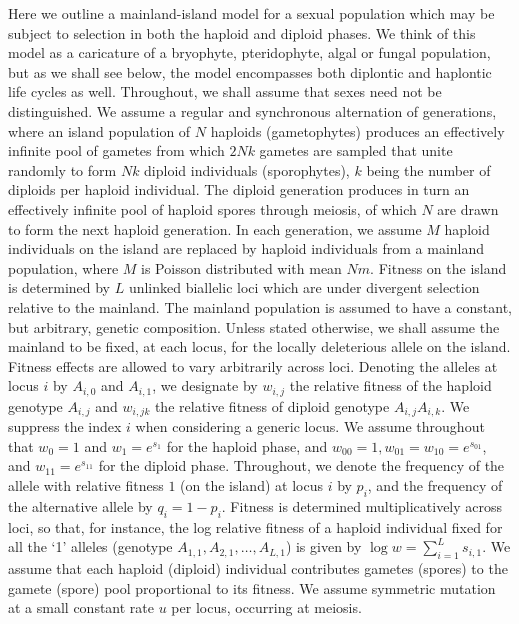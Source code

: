 \documentclass[
  11pt,
]{article}
\begin{document}
Here we outline a mainland-island model for a sexual population which
may be subject to selection in both the haploid and diploid phases. We
think of this model as a caricature of a bryophyte, pteridophyte, algal
or fungal population, but as we shall see below, the model encompasses
both diplontic and haplontic life cycles as well. Throughout, we shall
assume that sexes need not be distinguished. We assume a regular and
synchronous alternation of generations, where an island population of
\(N\) haploids (gametophytes) produces an effectively infinite pool of
gametes from which \(2Nk\) gametes are sampled that unite randomly to
form \(N k\) diploid individuals (sporophytes), \(k\) being the number
of diploids per haploid individual. The diploid generation produces in
turn an effectively infinite pool of haploid spores through meiosis, of
which \(N\) are drawn to form the next haploid generation. In each
generation, we assume \(M\) haploid individuals on the island are
replaced by haploid individuals from a mainland population, where \(M\)
is Poisson distributed with mean \(Nm\). Fitness on the island is
determined by \(L\) unlinked biallelic loci which are under divergent
selection relative to the mainland. The mainland population is assumed
to have a constant, but arbitrary, genetic composition. Unless stated
otherwise, we shall assume the mainland to be fixed, at each locus, for
the locally deleterious allele on the island. Fitness effects are
allowed to vary arbitrarily across loci. Denoting the alleles at locus
\(i\) by \(A_{i,0}\) and \(A_{i,1}\), we designate by \(w_{i,j}\) the
relative fitness of the haploid genotype \(A_{i,j}\) and \(w_{i,jk}\)
the relative fitness of diploid genotype \(A_{i,j}A_{i,k}\). We suppress
the index \(i\) when considering a generic locus. We assume throughout
that \(w_0 = 1\) and \(w_1 = e^{s_1}\) for the haploid phase, and
\(w_{00} = 1, w_{01} = w_{10} = e^{s_{01}}\), and
\(w_{11} = e^{s_{11}}\) for the diploid phase. Throughout, we denote the
frequency of the allele with relative fitness \(1\) (on the island) at
locus \(i\) by \(p_i\), and the frequency of the alternative allele by
\(q_i = 1-p_i\). Fitness is determined multiplicatively across loci, so
that, for instance, the log relative fitness of a haploid individual
fixed for all the `1' alleles (genotype
\(A_{1,1},A_{2,1}, \dots, A_{L,1}\)) is given by
\(\log w = \sum_{i=1}^L s_{i,1}\). We assume that each haploid (diploid)
individual contributes gametes (spores) to the gamete (spore) pool
proportional to its fitness. We assume symmetric mutation at a small
constant rate \(u\) per locus, occurring at meiosis.
\end{document}
